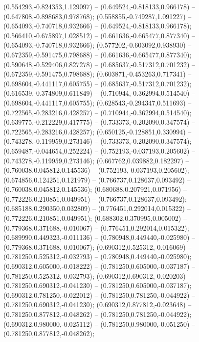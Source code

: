 (0.554293,-0.824353,1.129097) -- (0.649524,-0.818133,0.966178) -- (0.647808,-0.898683,0.978768);
 (0.558855,-0.749287,1.091227) -- (0.654093,-0.740718,0.932666) -- (0.649524,-0.818133,0.966178);
 (0.566410,-0.675897,1.028512) -- (0.661636,-0.665477,0.877340) -- (0.654093,-0.740718,0.932666);
 (0.577202,-0.603092,0.938930) -- (0.672359,-0.591475,0.798688) -- (0.661636,-0.665477,0.877340);
 (0.590648,-0.529406,0.827278) -- (0.685637,-0.517312,0.701232) -- (0.672359,-0.591475,0.798688);
 (0.603871,-0.453263,0.717341) -- (0.698604,-0.441117,0.605755) -- (0.685637,-0.517312,0.701232);
 (0.616539,-0.374809,0.611849) -- (0.710944,-0.362994,0.514540) -- (0.698604,-0.441117,0.605755);
 (0.628543,-0.294347,0.511693) -- (0.722565,-0.283216,0.428257) -- (0.710944,-0.362994,0.514540);
 (0.639775,-0.212229,0.417775) -- (0.733373,-0.202090,0.347574) -- (0.722565,-0.283216,0.428257);
 (0.650125,-0.128851,0.330994) -- (0.743278,-0.119959,0.273146) -- (0.733373,-0.202090,0.347574);
 (0.659487,-0.044654,0.252224) -- (0.752193,-0.037193,0.205602) -- (0.743278,-0.119959,0.273146);
 (0.667762,0.039882,0.182297) -- (0.760038,0.045812,0.145536) -- (0.752193,-0.037193,0.205602);
 (0.674856,0.124251,0.121979) -- (0.766737,0.128637,0.093492) -- (0.760038,0.045812,0.145536);
 (0.680688,0.207921,0.071956) -- (0.772226,0.210851,0.049951) -- (0.766737,0.128637,0.093492);
 (0.685188,0.290350,0.032809) -- (0.776451,0.292014,0.015322) -- (0.772226,0.210851,0.049951);
 (0.688302,0.370995,0.005002) -- (0.779368,0.371688,-0.010067) -- (0.776451,0.292014,0.015322);
 (0.689990,0.449323,-0.011136) -- (0.780948,0.449440,-0.025980) -- (0.779368,0.371688,-0.010067);
 (0.690312,0.525312,-0.016069) -- (0.781250,0.525312,-0.032793) -- (0.780948,0.449440,-0.025980);
 (0.690312,0.605000,-0.018222) -- (0.781250,0.605000,-0.037187) -- (0.781250,0.525312,-0.032793);
 (0.690312,0.690312,-0.020203) -- (0.781250,0.690312,-0.041230) -- (0.781250,0.605000,-0.037187);
 (0.690312,0.781250,-0.022012) -- (0.781250,0.781250,-0.044922) -- (0.781250,0.690312,-0.041230);
 (0.690312,0.877812,-0.023648) -- (0.781250,0.877812,-0.048262) -- (0.781250,0.781250,-0.044922);
 (0.690312,0.980000,-0.025112) -- (0.781250,0.980000,-0.051250) -- (0.781250,0.877812,-0.048262);
